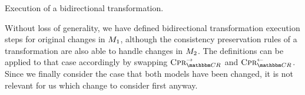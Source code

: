 
\begin{algorithm}
    
    \caption[Execution of a bidirectional transformation]{Execution of a bidirectional transformation.}
    \label{algo:synchronization:execute_bidirectional_transformation}
\end{algorithm}



Without loss of generality, we have defined bidirectional transformation execution steps for original changes in $\metamodel{M}{1}$, although the consistency preservation rules of a transformation are also able to handle changes in $\metamodel{M}{2}$.
The definitions can be applied to that case accordingly by swapping $\consistencypreservationrule{\consistencyrelationset{CR}}^{\rightarrow}$ and $\consistencypreservationrule{\consistencyrelationset{CR}}^{\leftarrow}$.
Since we finally consider the case that both models have been changed, it is not relevant for us which change to consider first anyway.



